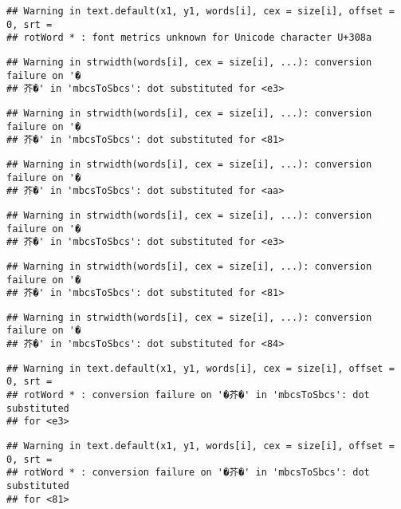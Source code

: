 \documentclass[]{article}
\begin{document}
\begin{verbatim}
## Warning in text.default(x1, y1, words[i], cex = size[i], offset = 0, srt =
## rotWord * : font metrics unknown for Unicode character U+308a
\end{verbatim}

\begin{verbatim}
## Warning in strwidth(words[i], cex = size[i], ...): conversion failure on '�
## 芥�' in 'mbcsToSbcs': dot substituted for <e3>
\end{verbatim}

\begin{verbatim}
## Warning in strwidth(words[i], cex = size[i], ...): conversion failure on '�
## 芥�' in 'mbcsToSbcs': dot substituted for <81>
\end{verbatim}

\begin{verbatim}
## Warning in strwidth(words[i], cex = size[i], ...): conversion failure on '�
## 芥�' in 'mbcsToSbcs': dot substituted for <aa>
\end{verbatim}

\begin{verbatim}
## Warning in strwidth(words[i], cex = size[i], ...): conversion failure on '�
## 芥�' in 'mbcsToSbcs': dot substituted for <e3>
\end{verbatim}

\begin{verbatim}
## Warning in strwidth(words[i], cex = size[i], ...): conversion failure on '�
## 芥�' in 'mbcsToSbcs': dot substituted for <81>
\end{verbatim}

\begin{verbatim}
## Warning in strwidth(words[i], cex = size[i], ...): conversion failure on '�
## 芥�' in 'mbcsToSbcs': dot substituted for <84>
\end{verbatim}

\begin{verbatim}
## Warning in text.default(x1, y1, words[i], cex = size[i], offset = 0, srt =
## rotWord * : conversion failure on '�芥�' in 'mbcsToSbcs': dot substituted
## for <e3>
\end{verbatim}

\begin{verbatim}
## Warning in text.default(x1, y1, words[i], cex = size[i], offset = 0, srt =
## rotWord * : conversion failure on '�芥�' in 'mbcsToSbcs': dot substituted
## for <81>
\end{verbatim}
\end{document}
